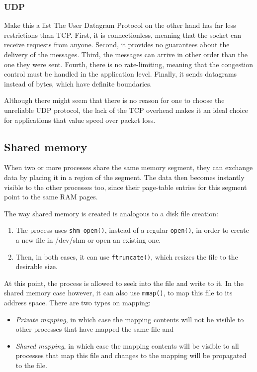 \subsubsection{UDP}

\fixme Make this a list
The User Datagram Protocol on the other hand has far less restrictions than 
TCP. First, it is connectionless, meaning that the socket can receive requests 
from anyone. Second, it provides no guarantees about the delivery of the 
messages. Third, the messages can arrive in other order than the one they were 
sent. Fourth, there is no rate-limiting, meaning that the congestion control 
must be handled in the application level. Finally, it sends datagrams instead 
of bytes, which have definite boundaries.

Although there might seem that there is no reason for one to choose the 
unreliable UDP protocol, the lack of the TCP overhead makes it an ideal choice 
for applications that value speed over packet loss.

\subsection{Shared memory}

When two or more processes share the same memory segment, they can exchange 
data by placing it in a region of the segment. The data then becomes instantly 
visible to the other processes too, since their page-table entries for this 
segment point to the same RAM pages.

The way shared memory is created is analogous to a disk file creation:

\begin{enumerate}
	\item The process uses \texttt{shm\_open()}, instead of a regular 
		\texttt{open()}, in order to create a new file in /dev/shm or 
		open an existing one.
	\item Then, in both cases, it can use \texttt{ftruncate()}, which 
		resizes the file to the desirable size.
\end{enumerate}

At this point, the process is allowed to seek into the file and write to it. In 
the shared memory case however, it can also use \texttt{mmap()}, to map this 
file to its address space. There are two types on mapping:

\begin{itemize}
	\item \textit{Private mapping}, in which case the mapping contents will 
		not be visible to other processes that have mapped the same 
		file and
	\item \textit{Shared mapping}, in which case the mapping contents will 
		be visible to all processes that map this file and changes to 
		the mapping will be propagated to the file.
\end{itemize}

